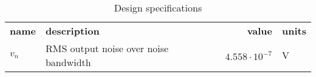 \begin{table}[H]
\centering
\begin{tabular}[c]{llrl}
\textbf{name} & \textbf{description} & \textbf{value} & \textbf{units} \\ 
\rowcolor{myyellow}
$v_{n}$ &\small{RMS output noise over noise bandwidth} &$4.558 \cdot 10^{-7}$ &$\mathrm{V}$ \\ 
\end{tabular}
\caption{Design specifications}
\label{tab-design}
\end{table}


